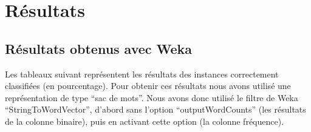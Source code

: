 \documentclass[a4paper, 11pt]{article}
\begin{document}
\section{Résultats}

\subsection{Résultats obtenus avec Weka}

Les tableaux suivant représentent les résultats des instances correctement classifiées (en pourcentage). Pour obtenir ces résultats nous avons utilisé une représentation de type ``sac de mots''. Nous avons donc utilisé le filtre de Weka ``StringToWordVector'', d'abord sans l'option ``outputWordCounts'' (les résultats de la colonne binaire), puis en activant cette option (la colonne fréquence).
\end{document}
